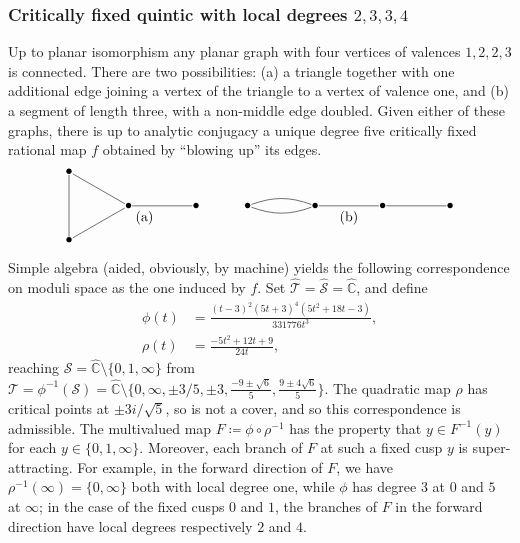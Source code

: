 \documentclass{amsart}
\newcommand\C{{\mathbb{C}}}
\theoremstyle{definition}
\theoremstyle{remark}
\newcommand{\cT}{\mathcal{T}}
\newcommand{\cS}{\mathcal{S}}
\begin{document}
\subsubsection*{Critically fixed quintic with local degrees $2, 3, 3, 4$}  Up to planar isomorphism any planar graph with four vertices of valences $1, 2, 2, 3$ is connected.  There are two possibilities: (a) a triangle together with one additional edge joining a vertex of the triangle to a vertex of valence one, and (b) a segment of length three, with a non-middle edge doubled.  Given either of these graphs, there is up to analytic conjugacy a unique degree five critically fixed rational map $f$ obtained by ``blowing up'' its edges.
\[\begin{tikzpicture}[every node/.style={inner sep=0mm}]
    \node (a1) at (0:1) {$\bullet$};
    \node (a2) at (120:1) {$\bullet$};
    \node (a3) at (240:1) {$\bullet$};
    \node (a4) at (0:2.7) {$\bullet$};
    \draw (a4) -- (a1) -- (a2) -- (a3) -- (a1);
    \node at (1.4,-0.3) {(a)};
    
    \node (b1) at (4,0) {$\bullet$};
    \node (b2) at (5.7,0) {$\bullet$};
    \node (b3) at (7.4,0) {$\bullet$};
    \node (b4) at (9.1,0) {$\bullet$};
    \draw (b1) edge[bend left=20] (b2) edge[bend right=20] (b2)
    (b2) -- (b3) -- (b4);
    \node at (6.55,-0.3) {(b)};
  \end{tikzpicture}\]
Simple algebra (aided, obviously, by machine) yields the following correspondence on moduli space as the one induced by $f$.  Set $\widehat{\cT}=\widehat{\cS}=\widehat{\C}$, and define
\begin{align*} \phi(t) &=\frac{(t-3)^2 (5 t+3)^4 (5 t^2+18 t-3)}{331776 t^3},\\
  \rho(t)&=\frac{-5 t^2+12 t+9}{24 t},
\end{align*}
reaching $\cS=\widehat{\C}\setminus\{0,1,\infty\}$ from $\cT=\phi^{-1}(\cS)=\widehat{\C}\setminus\{0,\infty,\pm 3/5, \pm 3, \frac{-9\pm \sqrt{6}}{5}, \frac{9\pm 4\sqrt{6}}{5}\}$. The quadratic map $\rho$ has critical points at $\pm 3i/\sqrt{5}$, so is not a cover, and so this correspondence is admissible. The multivalued map $F\coloneqq\phi \circ \rho^{-1}$ has the property that $y \in F^{-1}(y)$ for each $y\in \{0,1,\infty\}$. Moreover, each branch of $F$ at such a fixed cusp $y$ is super-attracting.  For example, in the forward direction of $F$, we have $\rho^{-1}(\infty)=\{0,\infty\}$ both with local degree one, while $\phi$ has degree $3$ at $0$ and $5$ at $\infty$; in the case of the fixed cusps $0$ and $1$, the branches of $F$ in the forward direction have local degrees respectively $2$ and $4$. 
\end{document}
